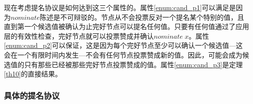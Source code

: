现在考虑提名协议是如何达到这三个属性的。属性\ref{enum:cand_p1}可以满足是因为$nominate$陈述是不可辩驳的。节点从不会投票反对一个提名某个特别的值，且直到第一个候选值被确认为止完好节点可以提名任何值。只要有任何值通过了应用层的有效性检查，完好节点就可以投票赞成并确认$nominate\;x$。属性\ref{enum:cand_p2}可以保证，这是因为每个完好节点至少可以确认一个候选值---这会在一个有限时间内发生---不会有任何节点投票赞成新的值。因此，可能会成为候选值的只有那些已经被那些完好节点投票赞成的值。属性\ref{enum:cand_p3}是定理\ref{th10}的直接结果。

\subsubsection{具体的提名协议}